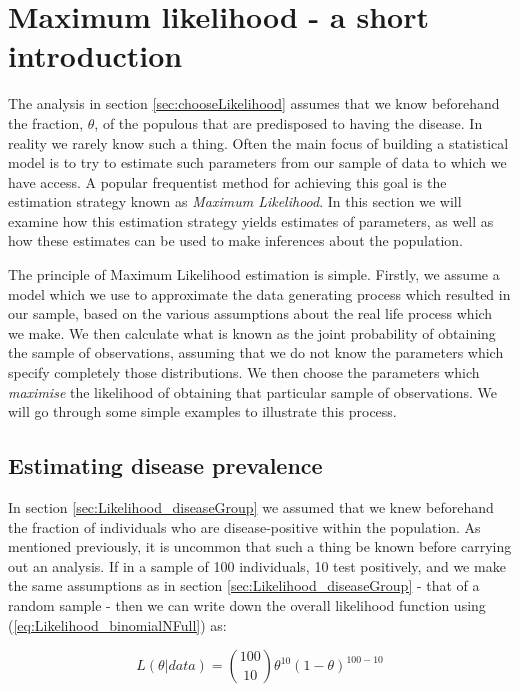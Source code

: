 \documentclass[11pt,fullpage]{book}
\begin{document}
\section{Maximum likelihood - a short introduction}\label{sec:Likelihood_MLE}
The analysis in section \ref{sec:chooseLikelihood} assumes that we know beforehand the fraction, $\theta$, of the populous that are predisposed to having the disease. In reality we rarely know such a thing. Often the main focus of building a statistical model is to try to estimate such parameters from our sample of data to which we have access. A popular frequentist method for achieving this goal is the estimation strategy known as \textit{Maximum Likelihood}. In this section we will examine how this estimation strategy yields estimates of parameters, as well as how these estimates can be used to make inferences about the population.

The principle of Maximum Likelihood estimation is simple. Firstly, we assume a model which we use to approximate the data generating process which resulted in our sample, based on the various assumptions about the real life process which we make. We then calculate what is known as the joint probability of obtaining the sample of observations, assuming that we do not know the parameters which specify completely those distributions. We then choose the parameters which \textit{maximise} the likelihood of obtaining that particular sample of observations. We will go through some simple examples to illustrate this process. 

\subsection{Estimating disease prevalence}\label{sec:Likelihood_diseaseMLE}
In section \ref{sec:Likelihood_diseaseGroup} we assumed that we knew beforehand the fraction of individuals who are disease-positive within the population. As mentioned previously, it is uncommon that such a thing be known before carrying out an analysis. If in a sample of 100 individuals, 10 test positively, and we make the same assumptions as in section \ref{sec:Likelihood_diseaseGroup} - that of a random sample - then we can write down the overall likelihood function using (\ref{eq:Likelihood_binomialNFull}) as:

\begin{equation}\label{eq:Likelihood_binomialNew}
L(\theta|data) = {100 \choose 10} \theta^{10} (1-\theta)^{100-10}
\end{equation}
\end{document}
